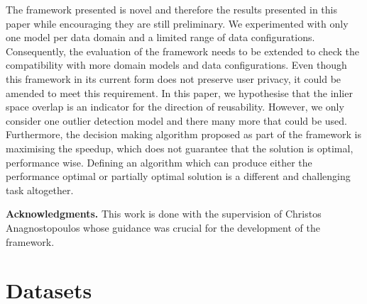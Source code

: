 \documentclass{mpaper}
\begin{document}
The framework presented is novel and therefore the results presented in this paper while encouraging they are still preliminary. We experimented with only one model per data domain and a limited range of data configurations. Consequently, the evaluation of the framework needs to be extended to check the compatibility with more domain models and data configurations. Even though this framework in its current form does not preserve user privacy, it could be amended to meet this requirement.
In this paper, we hypothesise that the inlier space overlap is an indicator for the direction of reusability. However, we only consider one outlier detection model and there many more that could be used. Furthermore, the decision making algorithm proposed as part of the framework is maximising the speedup, which does not guarantee that the solution is optimal, performance wise. Defining an algorithm which can produce either the performance optimal or partially optimal solution is a different and challenging task altogether.  

\vskip8pt \noindent
{\bf Acknowledgments.}
This work is done with the supervision of Christos Anagnostopoulos whose guidance was crucial for the development of the framework. 




\clearpage



\appendix

\section{Datasets}\label{apx:datasets}

\setcounter{figure}{0} 
\setcounter{table}{0}
\end{document}
